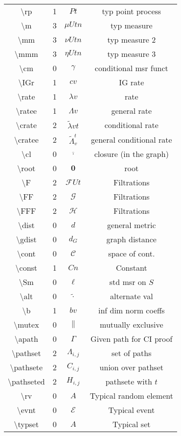 \documentclass[12pt]{article}
\newcommand{\mc}{\mathcal}
\newcommand{\ov}{\overline}
\newcommand{\tbs}{\textbackslash}
\renewcommand{\root}{\mathbf{0}}				%
\renewcommand{\v}{v}							%
\renewcommand{\U}{U}							%
\renewcommand{\S}{S}							%
\renewcommand{\b}{b}							%
\renewcommand{\t}{t}							%
\newcommand{\F}{\mc{F}}							%
\newcommand{\FG}[2]{\mc{G}}						%
\newcommand{\FH}[2]{\mc{H}}						%
\newcommand{\IGr}{c}							%
\newcommand{\cl}{\ov}							%
\newcommand{\const}{C}							%
\newcommand{\gdist}{d_G}						%
\newcommand{\cont}{\mc{C}}						%
\newcommand{\Sm}{\ell}							%
\newcommand{\rate}{\lambda}						%
\newcommand{\alt}[1]{\widetilde{#1}}			%
\newcommand{\m}{\mu}							%
\newcommand{\mm}{\nu}							%
\newcommand{\mmm}{\eta}							%
\newcommand{\cm}{\gamma}						%
\newcommand{\mutex}{\|}							%
\newcommand{\apath}{\Gamma}						%
\newcommand{\pathset}[2]{\Lambda_{#1,#2}}		%
\newcommand{\pathsete}[2]{C_{#1,#2}}			%
\newcommand{\pathseted}[2]{H_{#1,#2}}			%
\newcommand{\evnt}{\mc{E}}						%
\newcommand{\rv}{A}								%
\newcommand{\rp}{P}								%
\newcommand{\typset}{A}							%
\newcommand{\ratee}{\Lambda}					%
\newcommand{\crate}{\alt{\lambda}}				%
\newcommand{\cratee}[2]{\alt{\Lambda}_{#1}^{#2}} 	%
\newcommand{\dist}{d}								%
\begin{document}
\begin{longtable}{c|c|c|c}
\tbs rp&1& \(\rp{\t}\)						&typ point process\\
\tbs m&3&\(\m{\U}{\t}{n}\)						&typ measure\\
\tbs mm&3&\(\mm{\U}{\t}{n}\)						&typ measure 2\\
\tbs mmm&3&\(\mmm{\U}{\t}{n}\)						&typ measure 3\\
\tbs cm&0&\(\cm\)							&conditional msr funct\\
\tbs IGr&1&\(\IGr{\v}\)						&IG rate\\
\tbs rate&1&\(\rate{\v}\)					&rate\\
\tbs ratee&1&\(\ratee{\v}\)					&general rate\\
\tbs crate&2&\(\crate{\v}{\t}\)		&conditional rate\\
\tbs cratee&2&\(\cratee{\v}{\t}\)		&general conditional rate\\
\tbs cl&0&\(\cl{\cdot}\)			&closure (in the graph)\\
\tbs root&0&\(\root\)				&root\\
\tbs F&2&\(\F{\U}{\t}\)&Filtrations\\
\tbs FF&2&\(\FG{\U}{\t}\)&Filtrations\\
\tbs FFF&2&\(\FH{\U}{\t}\)&Filtrations\\
\tbs dist&0& \(\dist\)				&general metric\\
\tbs gdist &0& \(\gdist\)			&graph distance\\
\tbs cont &0& \(\cont\)				&space of cont. \\
\tbs const &1& \(\const{n}\)	&Constant\\
\tbs Sm&0&\(\Sm\)							&std msr on \(\S\)\\
\tbs alt&0&\(\widetilde{\cdot}\)			&alternate val\\
\tbs b&1& \(\b{\v}\)						&inf dim norm coeffs\\
\tbs mutex&0&\(\mutex\)						&mutually exclusive\\
\tbs apath&0&\(\apath\)						&Given path for CI proof\\
\tbs pathset&2&\(\pathset{i}{j}\)	&set of paths\\
\tbs pathsete&2&\(\pathsete{i}{j}\)	&union over pathset\\
\tbs pathseted&2&\(\pathseted{i}{j}\)&pathsete with \(\t\)\\
\tbs rv&0& \(\rv\)							&Typical random element\\
\tbs evnt&0&\(\evnt\)						&Typical event\\
\tbs typset&0&\(\typset\)					&Typical set\\

\end{longtable}
\end{document}
